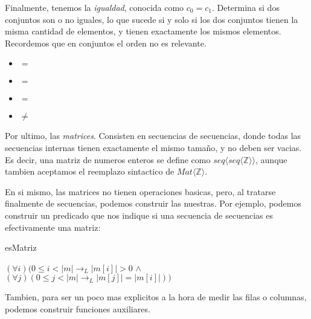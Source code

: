 \documentclass{article}
\begin{document}
Finalmente, tenemos la \textit{igualdad}, conocida como $c_{0} = c_{1}$. Determina si dos conjuntos son o no iguales, lo que sucede si y solo si los dos conjuntos tienen la misma cantidad de elementos, y tienen exactamente los mismos elementos. Recordemos que en conjuntos el orden no es relevante.

\begin{multicols}{2}
\begin{center}
	\begin{itemize}
	
		\item[]  $=$ 
		\item[]  $=$ 
		\item[]  $=$ 
		\item[]  $\neq$ 
		
	\end{itemize}
\end{center}
\end{multicols}

Por ultimo, las \textit{matrices}. Consisten en secuencias de secuencias, donde todas las secuencias internas tienen exactamente el mismo tamaño, y no deben ser vacias. Es decir, una matriz de numeros enteros se define como $seq \langle seq \langle \mathbb{Z} \rangle \rangle$, aunque tambien aceptamos el reemplazo sintactico de $Mat \langle \mathbb{Z} \rangle$.

En si mismo, las matrices no tienen operaciones basicas, pero, al tratarse finalmente de secuencias, podemos construir las nuestras. Por ejemplo, podemos construir un predicado que nos indique si una secuencia de secuencias es efectivamente una matriz:

\begin{pred}{esMatriz}{}
	
	$(\forall i) (0 \leq i < |m| \longrightarrow_{L} |m[i]|>0$ $\land$ $(\forall j) (0 \leq j < |m| \longrightarrow_{L} |m[j]| = |m[i]|))$	
	
\end{pred}

Tambien, para ser un poco mas explicitos a la hora de medir las filas o columnas, podemos construir funciones auxiliares.


\end{document}
